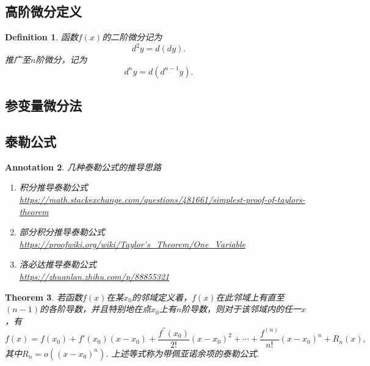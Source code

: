 \documentclass{article}
\newtheorem{theorem}{Theorem}[section]
\newtheorem{definition}[theorem]{Definition}
\newtheorem{annotation}[theorem]{Annotation}
\begin{document}
\subsection{高阶微分定义}

\begin{definition}
\rm 函数$f(x)$的二阶微分记为
$$
d^2y = d(dy).
$$
推广至$n$阶微分，记为
$$
d^ny = d(d^{n-1}y).
$$
\end{definition}

\subsection{参变量微分法}

\subsection{泰勒公式}

\begin{annotation}
\rm 几种泰勒公式的推导思路
\begin{enumerate}
	\item 积分推导泰勒公式 \\
	\url{https://math.stackexchange.com/questions/481661/simplest-proof-of-taylors-theorem} 
	\item 部分积分推导泰勒公式 \\ 
	\url{https://proofwiki.org/wiki/Taylor's_Theorem/One_Variable}
	\item 洛必达推导泰勒公式 \\
	\url{https://zhuanlan.zhihu.com/p/88855321}
\end{enumerate} 
\end{annotation}

\begin{theorem}
\rm 若函数$f(x)$在某$x_0$的邻域定义着，$f(x)$在此邻域上有直至$(n-1)$的各阶导数，并且特别地在点$x_0$上有$n$阶导数，则对于该邻域内的任一$x$，有
$$
f(x) = f(x_0) + f'(x_0)(x-x_0) + \frac{f^{''}(x_0)}{2!}(x-x_0)^2 + \cdots + \frac{f^{(n)}}{n!}(x-x_0)^n + R_n(x),
$$
其中$R_n = o((x-x_0)^n)$. 上述等式称为{\color{red}带佩亚诺余项的泰勒公式}.
\end{theorem}
\end{document}
